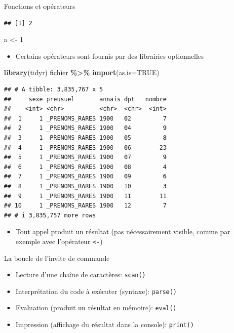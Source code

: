 \documentclass[
  ignorenonframetext,
]{beamer}
\newenvironment{Shaded}{\begin{snugshade}}{\end{snugshade}}
\newcommand{\AttributeTok}[1]{\textcolor[rgb]{0.13,0.29,0.53}{#1}}
\newcommand{\ConstantTok}[1]{\textcolor[rgb]{0.56,0.35,0.01}{#1}}
\newcommand{\DecValTok}[1]{\textcolor[rgb]{0.00,0.00,0.81}{#1}}
\newcommand{\FunctionTok}[1]{\textcolor[rgb]{0.13,0.29,0.53}{\textbf{#1}}}
\newcommand{\NormalTok}[1]{#1}
\newcommand{\OtherTok}[1]{\textcolor[rgb]{0.56,0.35,0.01}{#1}}
\newcommand{\SpecialCharTok}[1]{\textcolor[rgb]{0.81,0.36,0.00}{\textbf{#1}}}
\providecommand{\tightlist}{%
  \setlength{\itemsep}{0pt}\setlength{\parskip}{0pt}}
\begin{document}
\begin{frame}[fragile]{Fonctions et opérateurs}
\begin{verbatim}
## [1] 2
\end{verbatim}

\begin{Shaded}
\begin{Highlighting}[]
\NormalTok{a }\OtherTok{\textless{}{-}} \DecValTok{1}
\end{Highlighting}
\end{Shaded}

\normalsize

\begin{itemize}
\tightlist
\item
  Certains opérateurs sont fournis par des librairies optionnelles
\end{itemize}

\tiny

\begin{Shaded}
\begin{Highlighting}[]
\FunctionTok{library}\NormalTok{(tidyr)}
\NormalTok{fichier }\SpecialCharTok{\%\textgreater{}\%} \FunctionTok{import}\NormalTok{(}\AttributeTok{as.is=}\ConstantTok{TRUE}\NormalTok{)}
\end{Highlighting}
\end{Shaded}

\begin{verbatim}
## # A tibble: 3,835,767 x 5
##     sexe preusuel       annais dpt   nombre
##    <int> <chr>          <chr>  <chr>  <int>
##  1     1 _PRENOMS_RARES 1900   02         7
##  2     1 _PRENOMS_RARES 1900   04         9
##  3     1 _PRENOMS_RARES 1900   05         8
##  4     1 _PRENOMS_RARES 1900   06        23
##  5     1 _PRENOMS_RARES 1900   07         9
##  6     1 _PRENOMS_RARES 1900   08         4
##  7     1 _PRENOMS_RARES 1900   09         6
##  8     1 _PRENOMS_RARES 1900   10         3
##  9     1 _PRENOMS_RARES 1900   11        11
## 10     1 _PRENOMS_RARES 1900   12         7
## # i 3,835,757 more rows
\end{verbatim}

\normalsize

\begin{itemize}
\tightlist
\item
  Tout appel produit un résultat (pas nécessairement visible, comme par
  exemple avec l'opérateur \texttt{\textless{}-})
\end{itemize}
\end{frame}

\begin{frame}[fragile]{La boucle de l'invite de commande}
\protect\hypertarget{la-boucle-de-linvite-de-commande}{}
\begin{itemize}
\tightlist
\item
  Lecture d'une chaîne de caractères: \texttt{scan()}
\item
  Interprétation du code à exécuter (syntaxe): \texttt{parse()}
\item
  Evaluation (produit un résultat en mémoire): \texttt{eval()}
\item
  Impression (affichage du résultat dans la console): \texttt{print()}
\end{itemize}
\end{frame}
\end{document}
